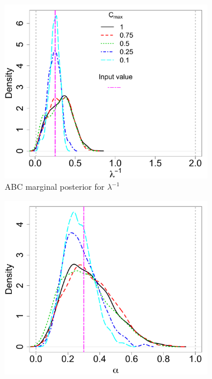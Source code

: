 \documentclass[12pt]{article}
\begin{document}
\begin{figure}[htbp]
   \centering
\begin{subfigure}{0.48\textwidth}
\centering
\includegraphics[width = \textwidth]{figures/marg_k_obs.pdf} 
\caption{ABC marginal posterior for $\lambda^{-1}$}\label{subfig:marg_k_obs}
\end{subfigure}
\begin{subfigure}{0.48\textwidth}
\centering
\includegraphics[width = \textwidth]{figures/marg_alpha_obs.pdf} 

\end{subfigure}
\end{figure}
\end{document}
